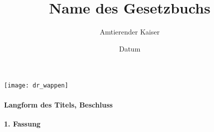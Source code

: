 \documentclass{article}
\title{Name des Gesetzbuchs}
\author{Amtierender Kaiser}
\date{Datum}
\begin{document}
\maketitle
\begin{center}
    \texttt{[image: dr\_wappen]}
\end{center}\vspace*{\fill}
\paragraph{Langform des Titels, Beschluss}

\newpage
{}
\vspace*{\fill}
\begin{Center}
\textbf{1. Fassung}
\vspace*{\fill}
\end{Center}
\newpage
\tableofcontents
\newpage

\end{document}
